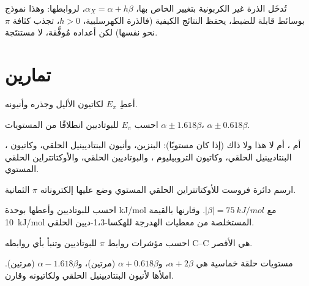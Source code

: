 تُدخَل الذرة غير الكربونية بتغيير  الخاص بها، $\alpha_X = \alpha + h\beta$، 
 لروابطها: وهذا نموذج بوسائط قابلة للضبط، يحفظ
النتائج الكيفية (فالذرة الكهرسلبية، $h > 0$، تجذب كثافة $\pi$ نحو
نفسها) لكن أعداده مُوفَّقة، لا مستنتَجة.

\section{تمارين}

\begin{exercise}[$\star$]\label{exo:b2:huckel:1}
أعطِ $E_\pi$ لكاتيون الأليل وجذره وأنيونه.
\end{exercise}

\begin{exercise}[$\star$]\label{exo:b2:huckel:2}
احسب $E_\pi$ للبوتاديين انطلاقًا من المستويات $\alpha \pm 1.618\beta$، $\alpha \pm 0.618\beta$.
\end{exercise}

\begin{exercise}[$\star$]\label{exo:b2:huckel:3}
، أم ، أم لا هذا ولا ذاك (إذا كان مستويًا): البنزين، وأنيون البنتاديينيل الحلقي،
وكاتيون البنتاديينيل الحلقي، وكاتيون التروبيليوم ، والبوتاديين الحلقي، 
والأوكتاتتراين الحلقي المستوي.
\end{exercise}

\begin{exercise}[$\star$]\label{exo:b2:huckel:4}
ارسم دائرة فروست للأوكتاتتراين الحلقي المستوي وضع عليها إلكتروناته $\pi$ الثمانية.
\end{exercise}

\begin{exercise}[$\star\star$]\label{exo:b2:huckel:5}
احسب  للبوتاديين وأعطها بوحدة \unit{kJ/mol} مع
$|\beta| = \qty{75}{kJ/mol}$. وقارنها بالقيمة \qty{10}{kJ/mol} المستخلصة من معطيات الهدرجة
للهكسا-1،3-ديين الحلقي.
\end{exercise}

\begin{exercise}[$\star\star$]\label{exo:b2:huckel:6}
احسب مؤشرات روابط $\pi$ للبوتاديين وتنبأ بأي روابطه C--C هي
الأقصر.
\end{exercise}

\begin{exercise}[$\star\star$]\label{exo:b2:huckel:7}
مستويات حلقة خماسية هي $\alpha + 2\beta$، و$\alpha + 0.618\beta$ (مرتين)، 
و$\alpha - 1.618\beta$ (مرتين). املأها لأنيون البنتاديينيل الحلقي ولكاتيونه 
وقارن.
\end{exercise}

